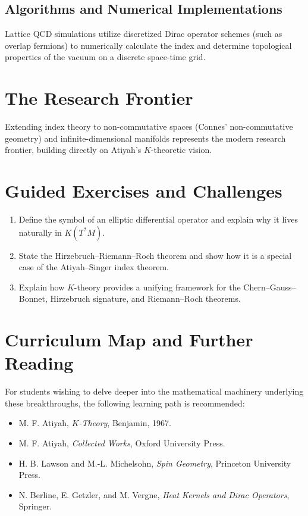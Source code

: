 \subsection{Algorithms and Numerical Implementations}
Lattice QCD simulations utilize discretized Dirac operator schemes (such as overlap fermions) to numerically calculate the index and determine topological properties of the vacuum on a discrete space-time grid.

\section{The Research Frontier}
Extending index theory to non-commutative spaces (Connes' non-commutative geometry) and infinite-dimensional manifolds represents the modern research frontier, building directly on Atiyah's $K$-theoretic vision.

\section{Guided Exercises and Challenges}
\begin{enumerate}[label=\textbf{\arabic*.}]
  \item Define the symbol of an elliptic differential operator and explain why it lives naturally in $K(T^*M)$.
  \item State the Hirzebruch--Riemann--Roch theorem and show how it is a special case of the Atiyah--Singer index theorem.
  \item Explain how $K$-theory provides a unifying framework for the Chern--Gauss--Bonnet, Hirzebruch signature, and Riemann--Roch theorems.
\end{enumerate}

\section{Curriculum Map and Further Reading}
For students wishing to delve deeper into the mathematical machinery underlying these breakthroughs, the following learning path is recommended:
\begin{itemize}
  \item M. F. Atiyah, \emph{$K$-Theory}, Benjamin, 1967.
  \item M. F. Atiyah, \emph{Collected Works}, Oxford University Press.
  \item H. B. Lawson and M.-L. Michelsohn, \emph{Spin Geometry}, Princeton University Press.
  \item N. Berline, E. Getzler, and M. Vergne, \emph{Heat Kernels and Dirac Operators}, Springer.
\end{itemize}

